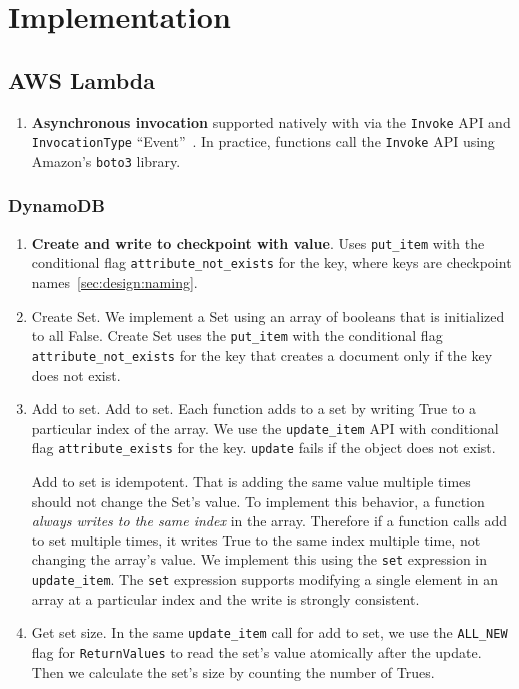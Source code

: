 \section{Implementation}\label{sec:impl}

\subsection{AWS Lambda}

\begin{enumerate}
  \item \textbf{Asynchronous invocation} supported natively with via the \texttt{Invoke} API and \texttt{InvocationType} ``Event''~\cite{aws-lambda-async-invoke}. In practice, functions call the \texttt{Invoke} API using Amazon's \texttt{boto3} library.
\end{enumerate}

\subsubsection{DynamoDB}

\begin{enumerate}
  \item \textbf{Create and write to checkpoint with value}. Uses \texttt{put\_item} with the conditional flag \texttt{attribute\_not\_exists} for the key, where keys are checkpoint names~\ref{sec:design:naming}. 
  \item Create Set. We implement a Set using an array of booleans that is initialized to all False. Create Set uses the \texttt{put\_item} with the conditional flag \texttt{attribute\_not\_exists} for the key that creates a document only if the key does not exist.
  \item Add to set. Add to set. Each function adds to a set by writing True to a particular index of the array. We use the \texttt{update\_item} API with conditional flag \texttt{attribute\_exists} for the key. \texttt{update} fails if the object does not exist.

  Add to set is idempotent. That is adding the same value multiple times should not change the Set's value. To implement this behavior, a function \emph{always writes to the same index} in the array. Therefore if a function calls add to set multiple times, it writes True to the same index multiple time, not changing the array's value. We implement this using the \texttt{set} expression in \texttt{update\_item}. The \texttt{set} expression supports modifying a single element in an array at a particular index and the write is strongly consistent.

  \item Get set size. In the same \texttt{update\_item} call for add to set, we use the \texttt{ALL\_NEW} flag for \texttt{ReturnValues} to read the set's value atomically after the update. Then we calculate the set's size by counting the number of Trues.
\end{enumerate}

